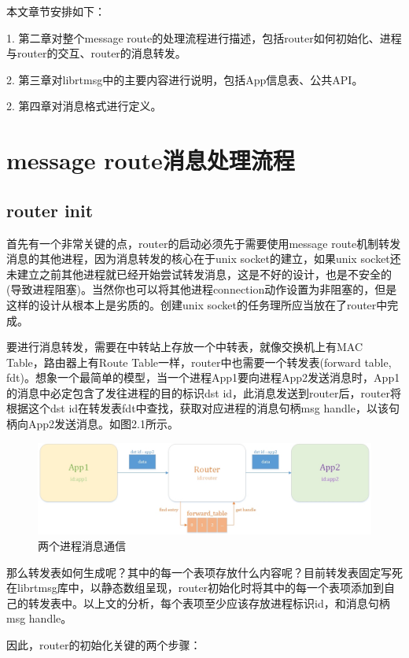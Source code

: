 \documentclass[a4paper,11pt,oneside]{ctexbook}
\begin{document}
本文章节安排如下：

1. 第二章对整个message route的处理流程进行描述，包括router如何初始化、进程与router的交互、router的消息转发。

2. 第三章对librtmsg中的主要内容进行说明，包括App信息表、公共API。

2. 第四章对消息格式进行定义。

\chapter{message route消息处理流程}

\section{router init}
首先有一个非常关键的点，router的启动必须先于需要使用message route机制转发消息的其他进程，因为消息转发的核心在于unix socket的建立，如果unix socket还未建立之前其他进程就已经开始尝试转发消息，这是不好的设计，也是不安全的(导致进程阻塞)。当然你也可以将其他进程connection动作设置为非阻塞的，但是这样的设计从根本上是劣质的。创建unix socket的任务理所应当放在了router中完成。

要进行消息转发，需要在中转站上存放一个中转表，就像交换机上有MAC Table，路由器上有Route Table一样，router中也需要一个转发表(forward table, fdt)。想象一个最简单的模型，当一个进程App1要向进程App2发送消息时，App1的消息中必定包含了发往进程的目的标识dst id，此消息发送到router后，router将根据这个dst id在转发表fdt中查找，获取对应进程的消息句柄msg handle，以该句柄向App2发送消息。如图2.1所示。

\begin{figure}[ht]
    \centering
    \includegraphics[width=1\textwidth]{image/message-router-03.jpg}
    \caption{两个进程消息通信}
\end{figure}

那么转发表如何生成呢？其中的每一个表项存放什么内容呢？目前转发表固定写死在librtmsg库中，以静态数组呈现，router初始化时将其中的每一个表项添加到自己的转发表中。以上文的分析，每个表项至少应该存放进程标识id，和消息句柄msg handle。

因此，router的初始化关键的两个步骤：
\end{document}
